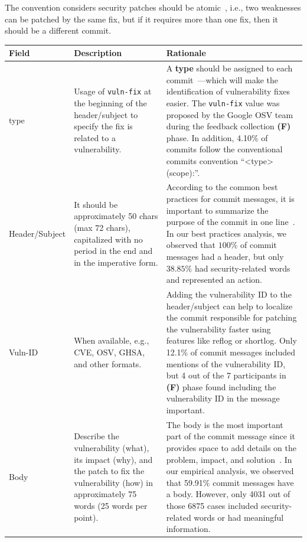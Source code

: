The convention considers security patches should be atomic~\cite{atomic}, i.e., two weaknesses can be patched by the same fix, but if it requires more than one fix, then it should be a different commit. 


\begin{table}
    \footnotesize
    \centering
    \begin{tabular}{ | p{1.75cm} | p{4cm} | p{11cm} | } 
    \hline
        \textbf{Field} & \textbf{Description} & \textbf{Rationale}\\\hline
        type & Usage of \texttt{vuln-fix} at the beginning of the header/subject to specify the fix is related to a vulnerability. & A \textbf{type} should be assigned to each commit~\cite{convcom}---which will make the identification of vulnerability fixes easier. The \texttt{vuln-fix} value was proposed by the Google OSV team during the feedback collection \textbf{(F)} phase. In addition, 4.10\% of commits follow the
conventional commits convention “<type>(scope):”. \\\hline
        Header/Subject & It should be approximately 50 chars (max 72 chars), capitalized with no period in the end and in the imperative form. & According to the common best practices for commit messages, it is important to summarize the purpose of the commit in one line~\cite{linus, goodcommit}. In our best practices analysis, we observed that $100\%$ of commit messages had a header, but only $38.85\%$ had security-related words and represented an action. \\\hline
        Vuln-ID & When available, e.g., CVE, OSV, GHSA, and other formats. & Adding the vulnerability ID to the header/subject can help to localize the commit responsible for patching the vulnerability faster using features like reflog or shortlog. Only 12.1\% of commit messages included mentions of the vulnerability ID, but 4 out of the 7 participants in \textbf{(F)} phase found including the vulnerability ID in the message important.\\\hline
        Body &  Describe the vulnerability (what), its impact (why), and the patch
    to fix the vulnerability (how) in approximately 75 words (25 words per point). & The body is the most important part of the commit message since it provides space to add details on the problem, impact, and solution~\cite{Tian_2022}. In our empirical analysis, we observed that  59.91\%
    commit messages have a body. However,  only 4031 out of those 6875 cases included security-related words or had meaningful information. \\\hline

\end{tabular}
\end{table}

